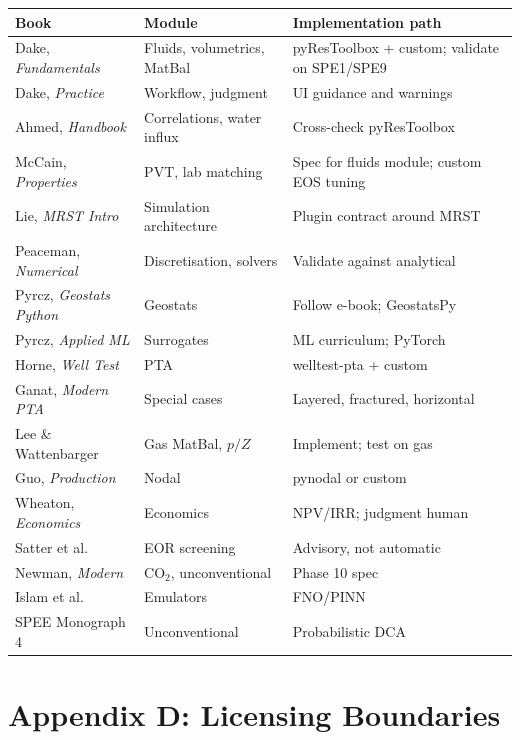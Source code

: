 \documentclass[10pt,a4paper]{article}
\begin{document}
\begin{longtable}{@{}p{4.4cm}p{3.6cm}p{5.0cm}@{}}
\toprule
Book & Module & Implementation path\\
\midrule
\endhead
Dake, \emph{Fundamentals} & Fluids, volumetrics, MatBal & pyResToolbox + custom; validate on SPE1/SPE9\\
Dake, \emph{Practice} & Workflow, judgment & UI guidance and warnings\\
Ahmed, \emph{Handbook} & Correlations, water influx & Cross-check pyResToolbox\\
McCain, \emph{Properties} & PVT, lab matching & Spec for fluids module; custom EOS tuning\\
Lie, \emph{MRST Intro} & Simulation architecture & Plugin contract around MRST\\
Peaceman, \emph{Numerical} & Discretisation, solvers & Validate against analytical\\
Pyrcz, \emph{Geostats Python} & Geostats & Follow e-book; GeostatsPy\\
Pyrcz, \emph{Applied ML} & Surrogates & ML curriculum; PyTorch\\
Horne, \emph{Well Test} & PTA & welltest-pta + custom\\
Ganat, \emph{Modern PTA} & Special cases & Layered, fractured, horizontal\\
Lee \& Wattenbarger & Gas MatBal, $p/Z$ & Implement; test on gas\\
Guo, \emph{Production} & Nodal & pynodal or custom\\
Wheaton, \emph{Economics} & Economics & NPV/IRR; judgment human\\
Satter et al. & EOR screening & Advisory, not automatic\\
Newman, \emph{Modern} & CO$_2$, unconventional & Phase 10 spec\\
Islam et al. & Emulators & FNO/PINN\\
SPEE Monograph 4 & Unconventional & Probabilistic DCA\\
\bottomrule
\end{longtable}

\section{Appendix D: Licensing Boundaries}
\end{document}
